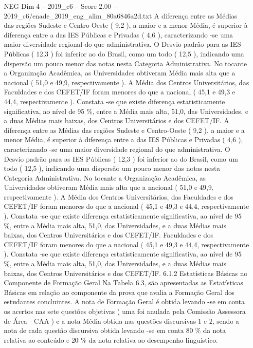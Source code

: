 \begin{textsample}{NEG Dim 4 – 2019\_c6 – Score 2.00 – 2019\_c6/enade\_2019\_eng\_alim\_80a6846a2d.txt}
A diferença entre as Médias das regiões Sudeste e Centro-Oeste ( 9,2 ), a maior e a menor Média, é superior à diferença entre a das IES Públicas e Privadas ( 4,6 ), caracterizando -se uma maior diversidade regional do que administrativa.
O Desvio padrão para as IES Públicas ( 12,3 ) foi inferior ao do Brasil, como um todo ( 12,5 ), indicando uma dispersão um pouco menor das notas nesta Categoria Administrativa.
No tocante a Organização Acadêmica, as Universidades obtiveram Média mais alta que a nacional ( 51,0 e 49,9, respectivamente ).
A Média dos Centros Universitários, das Faculdades e dos CEFET/IF foram menores do que a nacional ( 45,1 e 49,3 e 44,4, respectivamente ).
Constata -se que existe diferença estatisticamente significativa, ao nível de 95 \%, entre a Média mais alta, 51,0, das Universidades, e a duas Médias mais baixas, dos Centros Universitários e dos CEFET/IF.
A diferença entre as Médias das regiões Sudeste e Centro-Oeste ( 9,2 ), a maior e a menor Média, é superior à diferença entre a das IES Públicas e Privadas ( 4,6 ), caracterizando -se uma maior diversidade regional do que administrativa.
O Desvio padrão para as IES Públicas ( 12,3 ) foi inferior ao do Brasil, como um todo ( 12,5 ), indicando uma dispersão um pouco menor das notas nesta Categoria Administrativa.
No tocante a Organização Acadêmica, as Universidades obtiveram Média mais alta que a nacional ( 51,0 e 49,9, respectivamente ).
A Média dos Centros Universitários, das Faculdades e dos CEFET/IF foram menores do que a nacional ( 45,1 e 49,3 e 44,4, respectivamente ).
Constata -se que existe diferença estatisticamente significativa, ao nível de 95 \%, entre a Média mais alta, 51,0, das Universidades, e a duas Médias mais baixas, dos Centros Universitários e dos CEFET/IF.
Faculdades e dos CEFET/IF foram menores do que a nacional ( 45,1 e 49,3 e 44,4, respectivamente ).
Constata -se que existe diferença estatisticamente significativa, ao nível de 95 \%, entre a Média mais alta, 51,0, das Universidades, e a duas Médias mais baixas, dos Centros Universitários e dos CEFET/IF. 6.1.2 Estatísticas Básicas no Componente de Formação Geral Na Tabela 6.3, são apresentadas as Estatísticas Básicas em relação ao componente da prova que avalia a Formação Geral dos estudantes concluintes.
A nota de Formação Geral é obtida levando -se em conta os acertos nas sete questões objetivas ( uma foi anulada pela Comissão Assessora de Área - CAA ) e a nota Média obtida nas questões discursivas 1 e 2, sendo a nota de cada questão discursiva obtida levando -se em conta 80 \% da nota relativa ao conteúdo e 20 \% da nota relativa ao desempenho linguístico.

\end{textsample}
